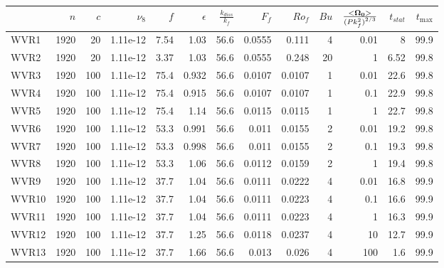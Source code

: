 \documentclass[a4paper]{article}
\begin{document}
\begin{tabular}{lrrrrrrrrrrrr}
\toprule
{} &   $n$ &  $c$ &  $\nu_8$ &  $f$ &  $\epsilon$ &  $\frac{k_{diss}}{k_f}$ &  $F_f$ &  $Ro_f$ &  $Bu$ &  $\frac{<\bf \Omega_0 >}{{(P k_f^2)}^{2/3}}$ &  $t_{stat}$ &  $t_{\max}$ \\
\midrule
WVR1  &  1920 &   20 & 1.11e-12 & 7.54 &        1.03 &                    56.6 & 0.0555 &   0.111 &     4 &                                         0.01 &           8 &        99.9 \\
WVR2  &  1920 &   20 & 1.11e-12 & 3.37 &        1.03 &                    56.6 & 0.0555 &   0.248 &    20 &                                            1 &        6.52 &        99.8 \\
WVR3  &  1920 &  100 & 1.11e-12 & 75.4 &       0.932 &                    56.6 & 0.0107 &  0.0107 &     1 &                                         0.01 &        22.6 &        99.8 \\
WVR4  &  1920 &  100 & 1.11e-12 & 75.4 &       0.915 &                    56.6 & 0.0107 &  0.0107 &     1 &                                          0.1 &        22.9 &        99.8 \\
WVR5  &  1920 &  100 & 1.11e-12 & 75.4 &        1.14 &                    56.6 & 0.0115 &  0.0115 &     1 &                                            1 &        22.7 &        99.8 \\
WVR6  &  1920 &  100 & 1.11e-12 & 53.3 &       0.991 &                    56.6 &  0.011 &  0.0155 &     2 &                                         0.01 &        19.2 &        99.8 \\
WVR7  &  1920 &  100 & 1.11e-12 & 53.3 &       0.998 &                    56.6 &  0.011 &  0.0155 &     2 &                                          0.1 &        19.3 &        99.8 \\
WVR8  &  1920 &  100 & 1.11e-12 & 53.3 &        1.06 &                    56.6 & 0.0112 &  0.0159 &     2 &                                            1 &        19.4 &        99.8 \\
WVR9  &  1920 &  100 & 1.11e-12 & 37.7 &        1.04 &                    56.6 & 0.0111 &  0.0222 &     4 &                                         0.01 &        16.8 &        99.9 \\
WVR10 &  1920 &  100 & 1.11e-12 & 37.7 &        1.04 &                    56.6 & 0.0111 &  0.0223 &     4 &                                          0.1 &        16.6 &        99.9 \\
WVR11 &  1920 &  100 & 1.11e-12 & 37.7 &        1.04 &                    56.6 & 0.0111 &  0.0223 &     4 &                                            1 &        16.3 &        99.9 \\
WVR12 &  1920 &  100 & 1.11e-12 & 37.7 &        1.25 &                    56.6 & 0.0118 &  0.0237 &     4 &                                           10 &        12.7 &        99.9 \\
WVR13 &  1920 &  100 & 1.11e-12 & 37.7 &        1.66 &                    56.6 &  0.013 &   0.026 &     4 &                                          100 &         1.6 &        99.9 \\
\bottomrule
\end{tabular}
\end{document}
